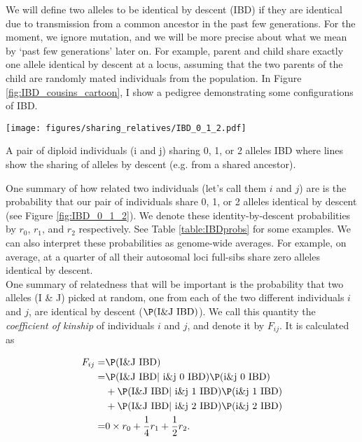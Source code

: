 {{We will define two alleles to be identical by descent (IBD) if they are
identical due to transmission from a common ancestor in the past few generations\cite{cotterman:40,malecot:48}. For the moment,
we ignore mutation, and we will be more precise about what we mean by `past few
generations' later on. For example, parent and child share exactly one allele
identical by descent at a locus, assuming that the two parents of the child are
randomly mated individuals from the population. In Figure
\ref{fig:IBD_cousins_cartoon}, I show a pedigree demonstrating some
configurations of IBD. \\
\begin{marginfigure}[0cm]
\begin{center}
\texttt{[image: figures/sharing\_relatives/IBD\_0\_1\_2.pdf]}
\end{center}
\caption{A pair of diploid individuals (i and j) sharing 0, 1, or 2 alleles IBD
  where lines show the sharing of alleles by descent (e.g. from a
  shared ancestor). } \label{fig:IBD_0_1_2}
\end{marginfigure}
One summary of how related two individuals (let's call them $i$ and $j$) are is the probability that our pair
of individuals share 0, 1, or 2 alleles identical by descent (see Figure
\ref{fig:IBD_0_1_2}). We denote these  identity-by-descent probabilities by $r_0$, $r_1$, and $r_2$
respectively. See Table \ref{table:IBDprobs} for some examples. We can also
interpret these probabilities as genome-wide averages. For example, on average, at a quarter of all their autosomal loci
full-sibs share zero alleles identical by descent.\\



One summary of relatedness that will be important is the probability that two
alleles (I \& J) picked at random, one from each of the two different individuals $i$
and $j$, are identical by descent ($\P(\text{I\&J IBD})$). We call this quantity the \emph{coefficient
of kinship} of individuals $i$ and $j$, and denote it by $F_{ij}$. It is
calculated as

\begin{align}
  F_{ij} = & \P(\text{I\&J IBD} )\\
  =& \P(\text{I\&J IBD} |~ \text{i\&j  0 IBD}) \P(\text{i\&j  0 IBD})  \nonumber\\
  & + \P(\text{I\&J IBD} |~ \text{i\&j  1 IBD})
    \P(\text{i\&j  1 IBD})  \nonumber\\
  &+ \P(\text{I\&J IBD} |~ \text{i\&j  2 IBD}) \P(\text{i\&j  2 IBD}) \label{eqn:coeffkinship_step}\\
   =   &   0 \times r_0 + \frac{1}{4} r_1  + \frac{1}{2} r_2.
\label{eqn:coeffkinship}
\end{align}


}}
